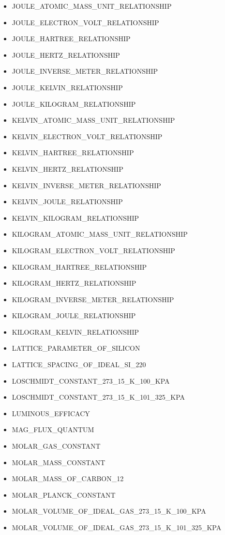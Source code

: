 \begin{itemize}
\item JOULE\_ATOMIC\_MASS\_UNIT\_RELATIONSHIP
\item JOULE\_ELECTRON\_VOLT\_RELATIONSHIP
\item JOULE\_HARTREE\_RELATIONSHIP
\item JOULE\_HERTZ\_RELATIONSHIP
\item JOULE\_INVERSE\_METER\_RELATIONSHIP
\item JOULE\_KELVIN\_RELATIONSHIP
\item JOULE\_KILOGRAM\_RELATIONSHIP
\item KELVIN\_ATOMIC\_MASS\_UNIT\_RELATIONSHIP
\item KELVIN\_ELECTRON\_VOLT\_RELATIONSHIP
\item KELVIN\_HARTREE\_RELATIONSHIP
\item KELVIN\_HERTZ\_RELATIONSHIP
\item KELVIN\_INVERSE\_METER\_RELATIONSHIP
\item KELVIN\_JOULE\_RELATIONSHIP
\item KELVIN\_KILOGRAM\_RELATIONSHIP
\item KILOGRAM\_ATOMIC\_MASS\_UNIT\_RELATIONSHIP
\item KILOGRAM\_ELECTRON\_VOLT\_RELATIONSHIP
\item KILOGRAM\_HARTREE\_RELATIONSHIP
\item KILOGRAM\_HERTZ\_RELATIONSHIP
\item KILOGRAM\_INVERSE\_METER\_RELATIONSHIP
\item KILOGRAM\_JOULE\_RELATIONSHIP
\item KILOGRAM\_KELVIN\_RELATIONSHIP
\item LATTICE\_PARAMETER\_OF\_SILICON
\item LATTICE\_SPACING\_OF\_IDEAL\_SI\_220
\item LOSCHMIDT\_CONSTANT\_273\_15\_K\_100\_KPA
\item LOSCHMIDT\_CONSTANT\_273\_15\_K\_101\_325\_KPA
\item LUMINOUS\_EFFICACY
\item MAG\_FLUX\_QUANTUM
\item MOLAR\_GAS\_CONSTANT
\item MOLAR\_MASS\_CONSTANT
\item MOLAR\_MASS\_OF\_CARBON\_12
\item MOLAR\_PLANCK\_CONSTANT
\item MOLAR\_VOLUME\_OF\_IDEAL\_GAS\_273\_15\_K\_100\_KPA
\item MOLAR\_VOLUME\_OF\_IDEAL\_GAS\_273\_15\_K\_101\_325\_KPA

\end{itemize}

